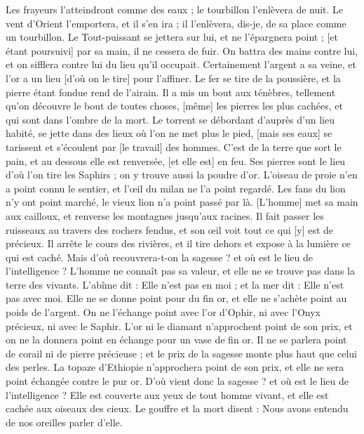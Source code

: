 \begin{multicols}{2}
Les frayeurs l'atteindront comme des eaux ; le tourbillon l'enlèvera de nuit.
Le vent d'Orient l'emportera, et il s'en ira ; il l'enlèvera, dis-je, de sa place comme un tourbillon.
Le Tout-puissant se jettera sur lui, et ne l'épargnera point ; [et étant poursuivi] par sa main, il ne cessera de fuir.
On battra des mains contre lui, et on sifflera contre lui du lieu qu'il occupait.
\VerseOne{}Certainement l'argent a sa veine, et l'or a un lieu [d'où on le tire] pour l'affiner.
Le fer se tire de la poussière, et la pierre étant fondue rend de l'airain.
Il a mis un bout aux ténèbres, tellement qu'on découvre le bout de toutes choses, [même] les pierres les plus cachées, et qui sont dans l'ombre de la mort.
Le torrent se débordant d'auprès d'un lieu habité, se jette dans des lieux où l'on ne met plus le pied, [mais ses eaux] se tarissent et s'écoulent par [le travail] des hommes.
C'est de la terre que sort le pain, et au dessous elle est renversée, [et elle est] en feu.
Ses pierres sont le lieu d'où l'on tire les Saphirs ; on y trouve aussi la poudre d'or.
L'oiseau de proie n'en a point connu le sentier, et l'œil du milan ne l'a point regardé.
Les fans du lion n'y ont point marché, le vieux lion n'a point passé par là.
[L'homme] met sa main aux cailloux, et renverse les montagnes jusqu'aux racines.
Il fait passer les ruisseaux au travers des rochers fendus, et son œil voit tout ce qui [y] est de précieux.
Il arrête le cours des rivières, et il tire dehors et expose à la lumière ce qui est caché.
Mais d'où recouvrera-t-on la sagesse ? et où est le lieu de l'intelligence ?
L'homme ne connaît pas sa valeur, et elle ne se trouve pas dans la terre des vivants.
L'abîme dit : Elle n'est pas en moi ; et la mer dit : Elle n'est pas avec moi.
Elle ne se donne point pour du fin or, et elle ne s'achète point au poids de l'argent.
On ne l'échange point avec l'or d'Ophir, ni avec l'Onyx précieux, ni avec le Saphir.
L'or ni le diamant n'approchent point de son prix, et on ne la donnera point en échange pour un vase de fin or.
Il ne se parlera point de corail ni de pierre précieuse ; et le prix de la sagesse monte plus haut que celui des perles.
La topaze d'Ethiopie n'approchera point de son prix, et elle ne sera point échangée contre le pur or.
D'où vient donc la sagesse ? et où est le lieu de l'intelligence ?
Elle est couverte aux yeux de tout homme vivant, et elle est cachée aux oiseaux des cieux.
Le gouffre et la mort disent : Nous avons entendu de nos oreilles parler d'elle.

\end{multicols}

